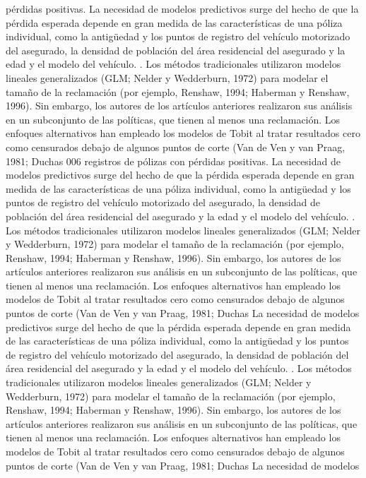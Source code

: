 \documentclass[]{article}
\begin{document}
pérdidas positivas. La necesidad de modelos predictivos surge del hecho
de que la pérdida esperada depende en gran medida de las características
de una póliza individual, como la antigüedad y los puntos de registro
del vehículo motorizado del asegurado, la densidad de población del área
residencial del asegurado y la edad y el modelo del vehículo. . Los
métodos tradicionales utilizaron modelos lineales generalizados (GLM;
Nelder y Wedderburn, 1972) para modelar el tamaño de la reclamación (por
ejemplo, Renshaw, 1994; Haberman y Renshaw, 1996). Sin embargo, los
autores de los artículos anteriores realizaron sus análisis en un
subconjunto de las políticas, que tienen al menos una reclamación. Los
enfoques alternativos han empleado los modelos de Tobit al tratar
resultados cero como censurados debajo de algunos puntos de corte (Van
de Ven y van Praag, 1981; Duchas 006 registros de pólizas con pérdidas
positivas. La necesidad de modelos predictivos surge del hecho de que la
pérdida esperada depende en gran medida de las características de una
póliza individual, como la antigüedad y los puntos de registro del
vehículo motorizado del asegurado, la densidad de población del área
residencial del asegurado y la edad y el modelo del vehículo. . Los
métodos tradicionales utilizaron modelos lineales generalizados (GLM;
Nelder y Wedderburn, 1972) para modelar el tamaño de la reclamación (por
ejemplo, Renshaw, 1994; Haberman y Renshaw, 1996). Sin embargo, los
autores de los artículos anteriores realizaron sus análisis en un
subconjunto de las políticas, que tienen al menos una reclamación. Los
enfoques alternativos han empleado los modelos de Tobit al tratar
resultados cero como censurados debajo de algunos puntos de corte (Van
de Ven y van Praag, 1981; Duchas La necesidad de modelos predictivos
surge del hecho de que la pérdida esperada depende en gran medida de las
características de una póliza individual, como la antigüedad y los
puntos de registro del vehículo motorizado del asegurado, la densidad de
población del área residencial del asegurado y la edad y el modelo del
vehículo. . Los métodos tradicionales utilizaron modelos lineales
generalizados (GLM; Nelder y Wedderburn, 1972) para modelar el tamaño de
la reclamación (por ejemplo, Renshaw, 1994; Haberman y Renshaw, 1996).
Sin embargo, los autores de los artículos anteriores realizaron sus
análisis en un subconjunto de las políticas, que tienen al menos una
reclamación. Los enfoques alternativos han empleado los modelos de Tobit
al tratar resultados cero como censurados debajo de algunos puntos de
corte (Van de Ven y van Praag, 1981; Duchas La necesidad de modelos
\end{document}
